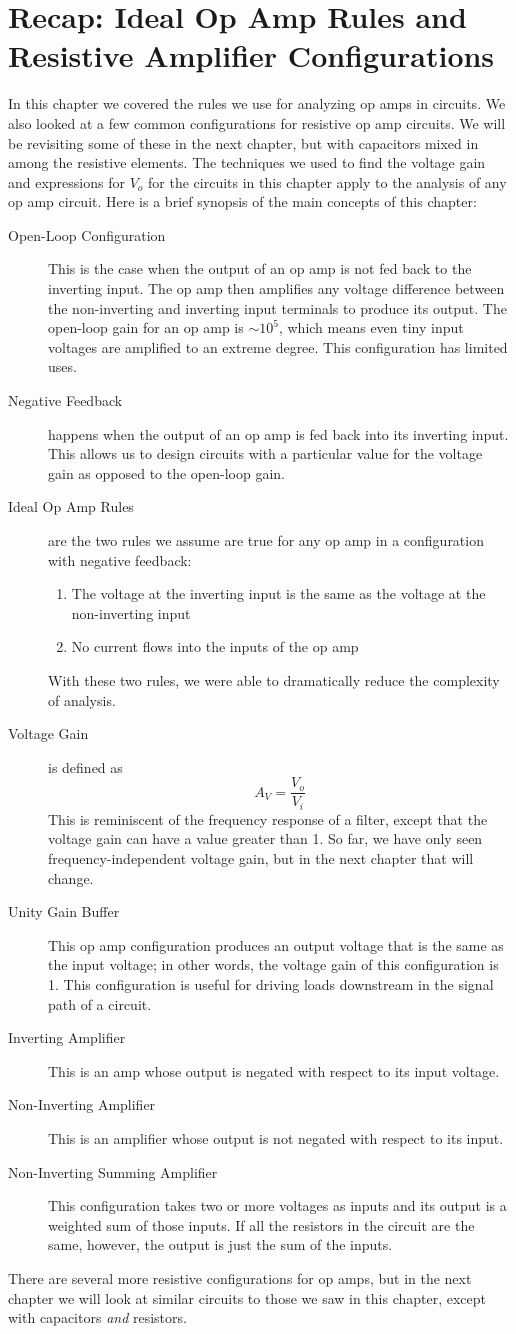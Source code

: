 \section{Recap: Ideal Op Amp Rules and Resistive Amplifier Configurations}
In this chapter we covered the rules we use for analyzing op amps in circuits. We also looked at a few common configurations for resistive op amp circuits. We will be revisiting some of these in the next chapter, but with capacitors mixed in among the resistive elements. The techniques we used to find the voltage gain and expressions for $V_o$ for the circuits in this chapter apply to the analysis of any op amp circuit. Here is a brief synopsis of the main concepts of this chapter:
\begin{description}
\item[Open-Loop Configuration] This is the case when the output of an op amp is not fed back to the inverting input. The op amp then amplifies any voltage difference between the non-inverting and inverting input terminals to produce its output. The open-loop gain for an op amp is $\sim10^5$, which means even tiny input voltages are amplified to an extreme degree. This configuration has limited uses.
\item[Negative Feedback] happens when the output of an op amp is fed back into its inverting input. This allows us to design circuits with a particular value for the voltage gain as opposed to the open-loop gain.
\item[Ideal Op Amp Rules] are the two rules we assume are true for any op amp in a configuration with negative feedback:
\begin{enumerate}
\item The voltage at the inverting input is the same as the voltage at the non-inverting input
\item No current flows into the inputs of the op amp
\end{enumerate}
With these two rules, we were able to dramatically reduce the complexity of analysis.
\item[Voltage Gain] is defined as 
$$
A_V = \frac{V_o}{V_i}
$$
This is reminiscent of the frequency response of a filter, except that the voltage gain can have a value greater than 1. So far, we have only seen frequency-independent voltage gain, but in the next chapter that will change.
\item[Unity Gain Buffer] This op amp configuration produces an output voltage that is the same as the input voltage; in other words, the voltage gain of this configuration is 1. This configuration is useful for driving loads downstream in the signal path of a circuit.
\item[Inverting Amplifier] This is an amp whose output is negated with respect to its input voltage.
\item[Non-Inverting Amplifier] This is an amplifier whose output is not negated with respect to its input. 
\item[Non-Inverting Summing Amplifier]This configuration takes two or more voltages as inputs and its output is a weighted sum of those inputs. If all the resistors in the circuit are the same, however, the output is just the sum of the inputs.
\end{description}

There are several more resistive configurations for op amps, but in the next chapter we will look at similar circuits to those we saw in this chapter, except with capacitors \textit{and} resistors.